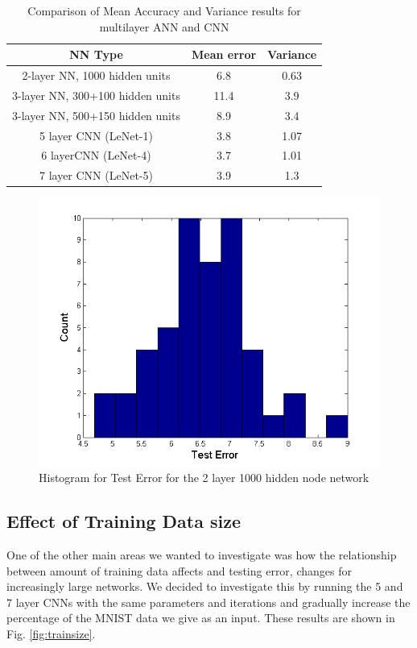 \documentclass[12pt, twocolumn]{article}
\begin{document}
\begin{table}
	\begin{center}
		\begin{tabular} { |c | c | c | }
			\hline
			NN Type & Mean error &   Variance\\ \hline
			2-layer NN, 1000 hidden units & 6.8  & 0.63\\ \hline
			3-layer NN, 300+100 hidden units & 11.4  & 3.9 \\ \hline
			3-layer NN, 500+150 hidden units & 8.9  & 3.4\\ \hline
			5 layer CNN  (LeNet-1) & 3.8  & 1.07 \\ \hline 
			6 layerCNN (LeNet-4) & 3.7 & 1.01\\ \hline 
			7 layer CNN (LeNet-5) &  3.9  &1.3\\ \hline
		\end{tabular}		
		\caption{Comparison of Mean Accuracy and Variance results for multilayer ANN and CNN}
		\label{table:variance}
	\end{center}
\end{table}

\begin{figure}
\includegraphics[scale=.5]{hist2layer.png}
\caption{Histogram for Test Error for the 2 layer 1000 hidden node network}
\label{fig:hist2layer}
\end{figure}



\subsection{Effect of Training Data size}
One of the other main areas we wanted to investigate was how the relationship between amount of training data affects and testing error, changes for increasingly large networks. We decided to investigate this by running the 5 and 7 layer CNNs with the same parameters and iterations and gradually increase the percentage of the MNIST data we give as an input. These results are shown in Fig. \ref{fig:trainsize}.  
\end{document}
